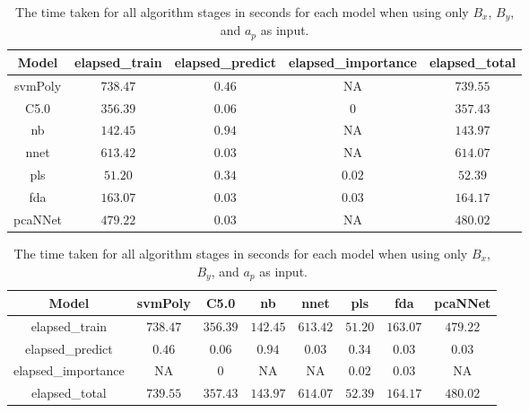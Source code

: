 \begin{table}[!ht]
	\centering
	\begin{tabular}{|c|c|c|c|c|}
		\hline
		Model & elapsed_train & elapsed_predict & elapsed_importance & elapsed_total \\ \hline
		svmPoly & $738.47$ & $0.46$ & NA & $739.55$ \\ \hline
		C5.0 & $356.39$ & $0.06$ & $0$ & $357.43$ \\ \hline
		nb & $142.45$ & $0.94$ & NA & $143.97$ \\ \hline
		nnet & $613.42$ & $0.03$ & NA & $614.07$ \\ \hline
		pls & $51.20$ & $0.34$ & $0.02$ & $52.39$ \\ \hline
		fda & $163.07$ & $0.03$ & $0.03$ & $164.17$ \\ \hline
		pcaNNet & $479.22$ & $0.03$ & NA & $480.02$ \\ \hline
	\end{tabular}
	\caption{The time taken for all algorithm stages in seconds for each model when using only $B_{x}$, $B_{y}$, and $a_{p}$ as input.}
	\label{tab:time:xyap}
\end{table}

\begin{table}[!ht]
	\centering
	\begin{tabular}{|c|c|c|c|c|c|c|c|}
		\hline
		Model & svmPoly & C5.0 & nb & nnet & pls & fda & pcaNNet \\ \hline
		elapsed_train & $738.47$ & $356.39$ & $142.45$ & $613.42$ & $51.20$ & $163.07$ & $479.22$ \\ \hline
		elapsed_predict & $0.46$ & $0.06$ & $0.94$ & $0.03$ & $0.34$ & $0.03$ & $0.03$ \\ \hline
		elapsed_importance & NA & $0$ & NA & NA & $0.02$ & $0.03$ & NA \\ \hline
		elapsed_total & $739.55$ & $357.43$ & $143.97$ & $614.07$ & $52.39$ & $164.17$ & $480.02$ \\ \hline
	\end{tabular}
	\caption{The time taken for all algorithm stages in seconds for each model when using only $B_{x}$, $B_{y}$, and $a_{p}$ as input.}
	\label{tab:time:reverse:xyap}
\end{table}

